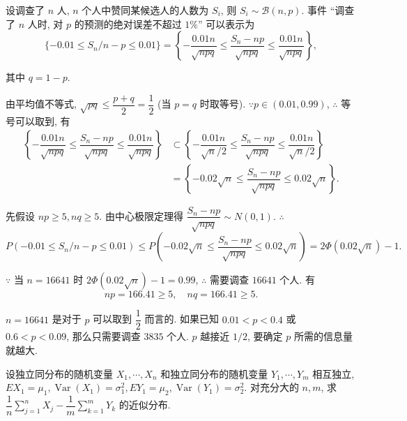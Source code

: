 \documentclass[color=black,device=normal,lang=cn]{elegantnote}
\numberwithin{equation}{section}
\theoremstyle{plain}
\numberwithin{exercise}{exsection}
\begin{document}
\begin{solution}
    设调查了 $n$ 人, $n$ 个人中赞同某候选人的人数为 $S_i$, 则 $S_i\sim\mathcal{B}(n,p)$. 事件 ``调查了 $n$ 人时, 对 $p$ 的预测的绝对误差不超过 $1\%$'' 可以表示为
    \[\{-0.01\leq S_n/n-p\leq0.01\}=\left\{-\dfrac{0.01n}{\sqrt{npq}}\leq\dfrac{S_n-np}{\sqrt{npq}}\leq\dfrac{0.01n}{\sqrt{npq}}\right\},\]

    其中 $q=1-p$.

    由平均值不等式, $\sqrt{pq}\leq\dfrac{p+q}{2}=\dfrac{1}{2}$ (当 $p=q$ 时取等号). $\because p\in(0.01,0.99)$, $\therefore$ 等号可以取到, 有
    \begin{align*}
        \left\{-\dfrac{0.01n}{\sqrt{npq}}\leq\dfrac{S_n-np}{\sqrt{npq}}\leq\dfrac{0.01n}{\sqrt{npq}}\right\} & \subset\left\{-\dfrac{0.01n}{\sqrt{n}/2}\leq\dfrac{S_n-np}{\sqrt{npq}}\leq\dfrac{0.01n}{\sqrt{n}/2}\right\} \\
        & =\left\{-0.02\sqrt{n}\leq\dfrac{S_n-np}{\sqrt{npq}}\leq0.02\sqrt{n}\right\}.
    \end{align*}

    先假设 $np\geq5,nq\geq5$. 由中心极限定理得 $\dfrac{S_n-np}{\sqrt{npq}}\sim N(0,1)$. $\therefore$
    \[P(-0.01\leq S_n/n-p\leq0.01)\leq P\left(-0.02\sqrt{n}\leq\dfrac{S_n-np}{\sqrt{npq}}\leq0.02\sqrt{n}\right)=2\Phi(0.02\sqrt{n})-1.\]

    $\because$ 当 $n=16641$ 时 $2\Phi(0.02\sqrt{n})-1=0.99$, $\therefore$ 需要调查 $16641$ 个人. 有
    \[np=166.41\geq5,\quad nq=166.41\geq5.\]
\end{solution}
\begin{note}
    $n=16641$ 是对于 $p$ 可以取到 $\dfrac{1}{2}$ 而言的. 如果已知 $0.01<p<0.4$ 或 $0.6<p<0.09$, 那么只需要调查 $3835$ 个人. $p$ 越接近 $1/2$, 要确定 $p$ 所需的信息量就越大.
\end{note}
\begin{exercise}%
    设独立同分布的随机变量 $X_1,\cdots,X_n$ 和独立同分布的随机变量 $Y_1,\cdots,Y_m$ 相互独立, $EX_1=\mu_1,\operatorname{Var}(X_1)=\sigma_1^2,EY_1=\mu_2,\operatorname{Var}(Y_1)=\sigma_2^2$. 对充分大的 $n,m$, 求 $\dfrac{1}{n}\sum\limits_{j=1}^nX_j-\dfrac{1}{m}\sum\limits_{k=1}^mY_k$ 的近似分布.
\end{exercise}
\end{document}
